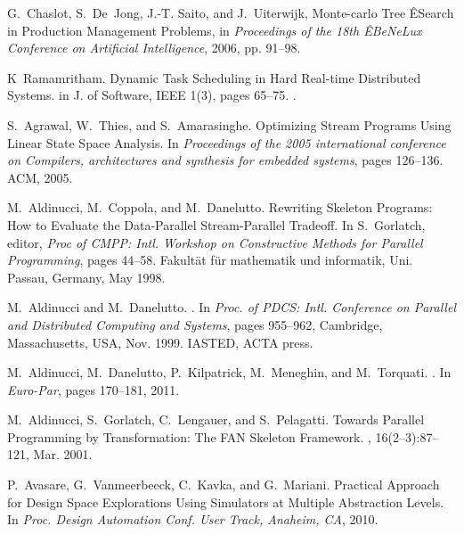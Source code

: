 \documentclass[smallextended]{svjour3}
\begin{document}
\begin{thebibliography}{10}

G.~Chaslot, S.~De~Jong, J.-T. Saito, and J.~Uiterwijk, Monte-carlo Tree
 ÊSearch in Production Management Problems, in \emph{Proceedings of the 18th
 ÊBeNeLux Conference on Artificial Intelligence}, 2006, pp. 91--98.

K~Ramamritham.
\newblock Dynamic Task Scheduling in Hard Real-time Distributed Systems.
\newblock in {J. of Software, IEEE 1(3), pages 65--75}.
.

S.~Agrawal, W.~Thies, and S.~Amarasinghe.
\newblock Optimizing Stream Programs Using Linear State Space Analysis.
\newblock In {\em Proceedings of the 2005 international conference on
  Compilers, architectures and synthesis for embedded systems}, pages 126--136.
  ACM, 2005.

M.~Aldinucci, M.~Coppola, and M.~Danelutto.
\newblock Rewriting {S}keleton {P}rograms: {H}ow to {E}valuate the
  {D}ata-{P}arallel {S}tream-{P}arallel {T}radeoff.
\newblock In S.~Gorlatch, editor, {\em Proc of CMPP: Intl. Workshop on
  Constructive Methods for Parallel Programming}, pages 44--58. Fakult{\"a}t
  f{\"u}r mathematik und informatik, Uni. Passau, Germany, May 1998.

M.~Aldinucci and M.~Danelutto.
.
\newblock In {\em Proc. of PDCS: Intl. Conference on Parallel and Distributed
  Computing and Systems}, pages 955--962, Cambridge, Massachusetts, USA, Nov.
  1999. IASTED, ACTA press.

M.~Aldinucci, M.~Danelutto, P.~Kilpatrick, M.~Meneghin, and M.~Torquati.
.
\newblock In {\em Euro-Par}, pages 170--181, 2011.

M.~Aldinucci, S.~Gorlatch, C.~Lengauer, and S.~Pelagatti.
\newblock Towards {P}arallel {P}rogramming by {T}ransformation: {T}he {FAN}
  {S}keleton {F}ramework.
, 16(2--3):87--121, Mar.
  2001.

P.~Avasare, G.~Vanmeerbeeck, C.~Kavka, and G.~Mariani.
\newblock Practical Approach for Design Space Explorations Using Simulators at
  Multiple Abstraction Levels.
\newblock In {\em Proc. Design Automation Conf. User Track, Anaheim, CA}, 2010.


\end{thebibliography}
\end{document}
